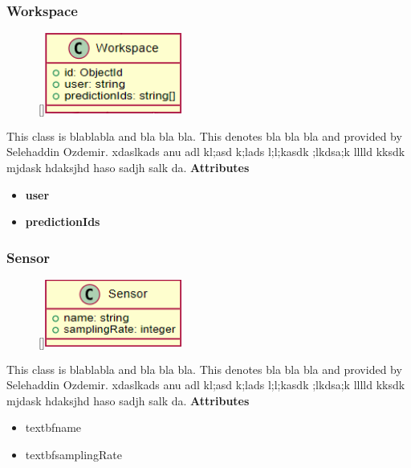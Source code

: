 \subsubsection{Workspace}
\label{mm-Workspace}
\begin{figure}
    \raisebox{0pt}[\dimexpr{}\baselineskip\relax]{\includegraphics[width=4.5cm]{classes/model-management/2.png}}
\end{figure} 
\par
This class is blablabla and bla bla bla. This denotes bla bla bla and provided by Selehaddin Ozdemir. xdaslkads anu adl kl;asd k;lads l;l;kasdk ;lkdsa;k lllld kksdk mjdask hdaksjhd haso sadjh salk da.
\newline
\newline
\textbf{Attributes}
\begin{itemize}
    \item \textbf{user}
    \item \textbf{predictionIds}
\end{itemize}

\subsubsection{Sensor}
\label{mm-Sensor}
\begin{figure}
    \raisebox{0pt}[\dimexpr{}\baselineskip\relax]{\includegraphics[width=4.5cm]{classes/model-management/3.png}}
\end{figure} 
\par
This class is blablabla and bla bla bla. This denotes bla bla bla and provided by Selehaddin Ozdemir. xdaslkads anu adl kl;asd k;lads l;l;kasdk ;lkdsa;k lllld kksdk mjdask hdaksjhd haso sadjh salk da.
\newline
\newline
\textbf{Attributes}
\begin{itemize}
    \item textbf{name}
    \item textbf{samplingRate}
\end{itemize}


